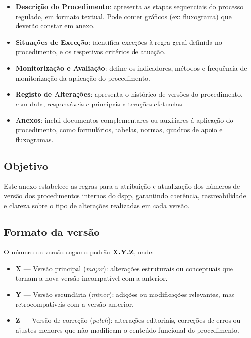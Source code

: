 \begin{itemize}
  \item \textbf{Descrição do Procedimento}: apresenta as etapas sequenciais do processo regulado, em formato textual. Pode conter  gráficos (ex: fluxograma) que deverão constar em anexo.

  \item \textbf{Situações de Exceção}: identifica exceções à regra geral definida no procedimento, e os respetivos critérios de atuação.

  \item \textbf{Monitorização e Avaliação}: define os indicadores, métodos e frequência de monitorização da aplicação do procedimento.

  \item \textbf{Registo de Alterações}: apresenta o histórico de versões do procedimento, com data, responsáveis e principais alterações efetuadas.

  \item \textbf{Anexos}: inclui documentos complementares ou auxiliares à aplicação do procedimento, como formulários, tabelas, normas, quadros de apoio e fluxogramas.
\end{itemize}

\pagebreak

\label{anexo-regras-versionamento}

\subsection*{Objetivo}

Este anexo estabelece as regras para a atribuição e atualização dos números de versão dos procedimentos internos do \gls{dspp}, garantindo coerência, rastreabilidade e clareza sobre o tipo de alterações realizadas em cada versão.

\subsection*{Formato da versão}

O número de versão segue o padrão \textbf{X.Y.Z}, onde:

\begin{itemize}
  \item \textbf{X} — Versão principal (\textit{major}): alterações estruturais ou conceptuais que tornam a nova versão incompatível com a anterior.
  \item \textbf{Y} — Versão secundária (\textit{minor}): adições ou modificações relevantes, mas retrocompatíveis com a versão anterior.
  \item \textbf{Z} — Versão de correção (\textit{patch}): alterações editoriais, correções de erros ou ajustes menores que não modificam o conteúdo funcional do procedimento.
\end{itemize}

